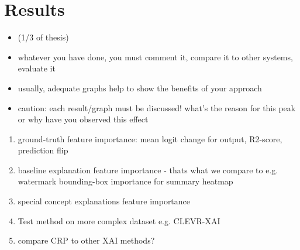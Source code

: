 \chapter{Results}\label{chapter:results}

{ \color{red} 
\begin{itemize}
    \item (1/3 of thesis)
    \item whatever you have done, you must comment it, compare it to other systems, evaluate it
    \item usually, adequate graphs help to show the benefits of your approach 
    \item caution: each result/graph must be discussed! what’s the reason for this peak or why have you observed this effect
\end{itemize}
 }

\begin{enumerate}
    \item ground-truth feature importance: mean logit change for output, R2-score,  prediction flip 
    \item baseline explanation feature importance - thats what we compare to e.g. watermark bounding-box importance for summary heatmap
    \item special concept explanations feature importance 
    \item Test method on more complex dataset e.g. CLEVR-XAI
    \item compare CRP to other XAI methods?
\end{enumerate}



